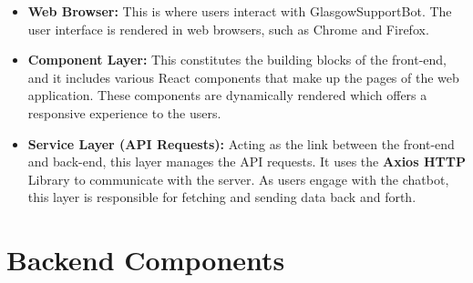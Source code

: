 \documentclass{l4proj}
\begin{document}
\begin{itemize}
    \item \textbf{Web Browser:} This is where users interact with GlasgowSupportBot. The user interface is rendered in web browsers, such as Chrome and Firefox.
    
    \item \textbf{Component Layer:} This constitutes the building blocks of the front-end, and it includes various React components that make up the pages of the web application. These components are dynamically rendered which offers a responsive experience to the users.
    
    \item \textbf{Service Layer (API Requests):} Acting as the link between the front-end and back-end, this layer manages the API requests. It uses the \textbf{Axios HTTP} Library to communicate with the server.  As users engage with the chatbot, this layer is responsible for fetching and sending data back and forth.
    
\end{itemize}

\section*{Backend Components}
\end{document}
